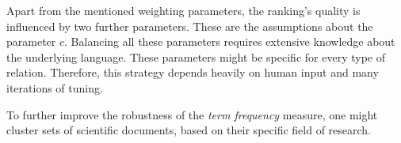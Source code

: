 \documentclass[runningheads]{llncs}
\begin{document}
Apart from the mentioned weighting parameters, the ranking's quality is
influenced by two further parameters. These are the assumptions about the
parameter $c$. Balancing all these parameters requires extensive knowledge
about the underlying language. These parameters might be specific for every
type of relation. Therefore, this strategy depends heavily on human input and
many iterations of tuning.

To further improve the robustness of the \emph{term frequency} measure, one
might cluster sets of scientific documents, based on their specific field of
research.



\begingroup
\let\clearpage\relax

\endgroup
\end{document}
